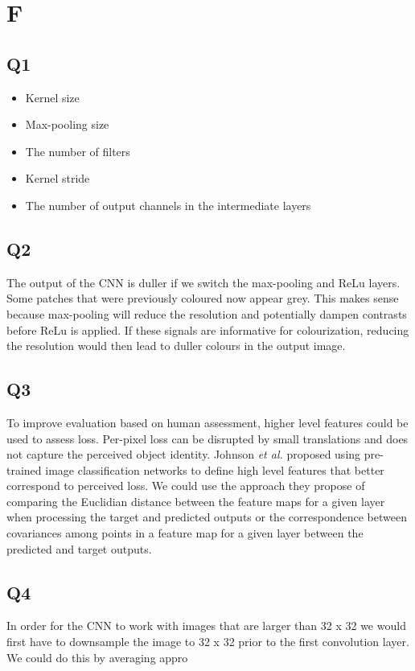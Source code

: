\documentclass[12pt,letterpaper]{article} %
\begin{document}
\section{F}
\subsection{Q1}
\begin{itemize}
	\item Kernel size
	\item Max-pooling size
	\item The number of filters
	\item Kernel stride
	\item The number of output channels in the intermediate layers
\end{itemize}
\subsection{Q2}
The output of the CNN is duller if we switch the max-pooling and ReLu layers. Some patches that were previously coloured now appear grey. This makes sense because max-pooling will reduce the resolution and potentially dampen contrasts before ReLu is applied. If these signals are informative for colourization, reducing the resolution would then lead to duller colours in the output image. 
\subsection{Q3}
To improve evaluation based on human assessment, higher level features could be used to assess loss. Per-pixel loss can be disrupted by small translations and does not capture the perceived object identity. Johnson \textit{et al.} proposed using pre-trained image classification networks to define high level features that better correspond to perceived loss. We could use the approach they propose of comparing the Euclidian distance between the feature maps for a given layer when processing the target and predicted outputs or the correspondence between covariances among points in a feature map for a given layer between the predicted and target outputs.
\subsection{Q4}
In order for the CNN to work with images that are larger than 32 x 32 we would first have to downsample the image to 32 x 32 prior to the first convolution layer. We could do this by averaging appro 
\end{document}
